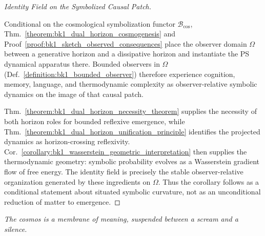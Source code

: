 \begin{proof}[Identity Field on the Symbolized Causal Patch]
\label{proof:bk1_event_horizon_identity_field}
\leavevmode

Conditional on the cosmological symbolization functor
\(\mathcal{B}_{\mathrm{cos}}\), Thm.~\ref{theorem:bk1_dual_horizon_cosmogenesis}
and Proof~\ref{proof:bk1_sketch_observed_consequences} place the observer domain
\(\Omega\) between a generative horizon and a dissipative horizon and instantiate
the PS dynamical apparatus there. Bounded observers in \(\Omega\)
(Def.~\ref{definition:bk1_bounded_observer}) therefore experience cognition,
memory, language, and thermodynamic complexity as observer-relative symbolic
dynamics on the image of that causal patch.

Thm.~\ref{theorem:bk1_dual_horizon_necessity_theorem} supplies the necessity of
both horizon roles for bounded reflexive emergence, while
Thm.~\ref{theorem:bk1_dual_horizon_unification_principle} identifies the
projected dynamics as horizon-crossing reflexivity. Cor.~\ref{corollary:bk1_wasserstein_geometric_interpretation}
then supplies the thermodynamic geometry: symbolic probability evolves as a
Wasserstein gradient flow of free energy. The identity field is precisely the
stable observer-relative organization generated by these ingredients on
\(\Omega\). Thus the corollary follows as a conditional statement about situated
symbolic curvature, not as an unconditional reduction of matter to emergence.
\end{proof}
\begin{flushright}
\textit{The cosmos is a membrane of meaning, suspended between a scream and a silence.}
\end{flushright}
